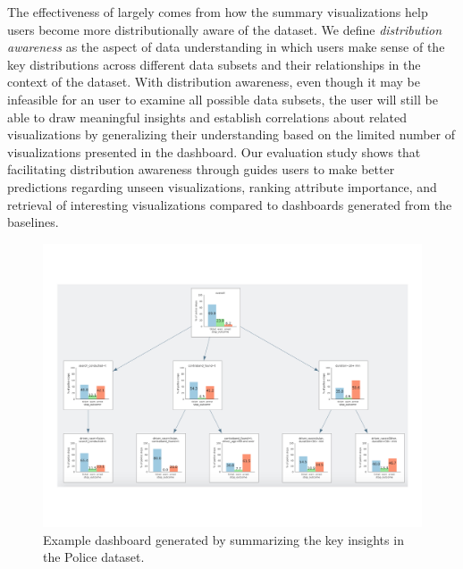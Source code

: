 \par The effectiveness of \sbd largely 
comes from how the summary visualizations 
help users become more distributionally aware of the dataset. 
We define \emph{distribution awareness} 
as the aspect of data understanding in which users make sense of the key distributions across different data subsets and their relationships in the context of the dataset. With distribution awareness, 
even though it may be infeasible for an 
user to examine all possible data subsets, 
the user will still be able to draw meaningful 
insights and establish correlations 
about related visualizations by 
generalizing their understanding based 
on the limited number of visualizations
 presented in the dashboard. 
 Our evaluation study shows that facilitating 
 distribution awareness through \sbd 
 guides users to make better predictions 
 regarding unseen visualizations, 
 ranking attribute importance, and 
 retrieval of interesting visualizations 
 compared to dashboards generated from the baselines. %

\begin{figure}
\centering
\vspace{-10pt}
\includegraphics[width=\linewidth]{figures/storyboard.pdf}
\caption{Example dashboard generated by \sbd summarizing the key insights in the Police dataset.}
\label{fig:sbd}
\vspace{-10pt}
\end{figure} 

